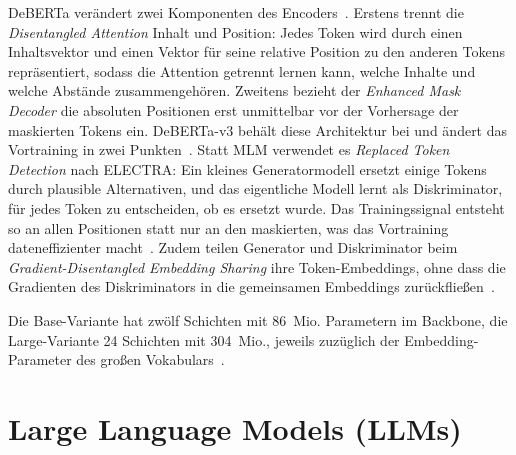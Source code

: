 DeBERTa verändert zwei Komponenten des
Encoders~\cite{he2020deberta}.
Erstens trennt die \emph{Disentangled Attention} Inhalt und Position:
Jedes Token wird durch einen Inhaltsvektor und einen Vektor für seine
relative Position zu den anderen Tokens repräsentiert, sodass die
Attention getrennt lernen kann, welche Inhalte und welche Abstände
zusammengehören.
Zweitens bezieht der \emph{Enhanced Mask Decoder} die absoluten
Positionen erst unmittelbar vor der Vorhersage der maskierten Tokens
ein.
DeBERTa-v3 behält diese Architektur bei und ändert das Vortraining in
zwei Punkten~\cite{he2021debertav3}.
Statt MLM verwendet es \emph{Replaced Token Detection} nach ELECTRA: Ein
kleines Generatormodell ersetzt einige Tokens durch plausible
Alternativen, und das eigentliche Modell lernt als Diskriminator, für
jedes Token zu entscheiden, ob es ersetzt wurde.
Das Trainingssignal entsteht so an allen Positionen statt nur an den
maskierten, was das Vortraining dateneffizienter
macht~\cite{clark2020electra}.
Zudem teilen Generator und Diskriminator beim \emph{Gradient-Disentangled
Embedding Sharing} ihre Token-Embeddings, ohne dass die Gradienten des
Diskriminators in die gemeinsamen Embeddings
zurückfließen~\cite{he2021debertav3}.

Die Base-Variante hat zwölf Schichten mit 86~Mio.
Parametern im Backbone, die Large-Variante 24 Schichten mit 304~Mio.,
jeweils zuzüglich der Embedding-Parameter des großen
Vokabulars~\cite{he2021debertav3card,he2021debertav3cardlarge}.

\section{Large Language Models (LLMs)}
\label{sec:llms}

